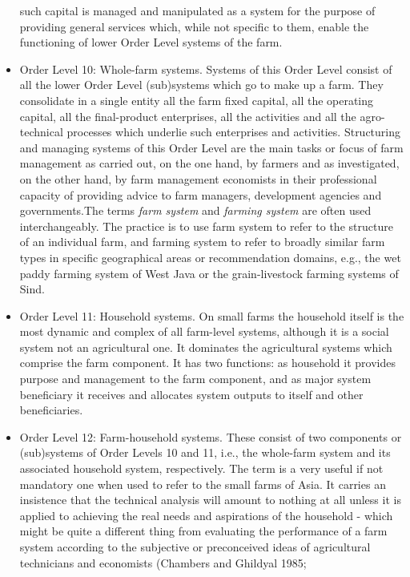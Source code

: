 \documentclass[11pt,]{book}
\theoremstyle{definition}
\theoremstyle{definition}
\theoremstyle{definition}
\theoremstyle{remark}
\begin{document}
\begin{itemize}
  such capital is managed and manipulated as a system for the purpose of
  providing general services which, while not specific to them, enable
  the functioning of lower Order Level systems of the farm.
\item
  Order Level 10: Whole-farm systems. Systems of this Order Level
  consist of all the lower Order Level (sub)systems which go to make up
  a farm. They consolidate in a single entity all the farm fixed
  capital, all the operating capital, all the final-product enterprises,
  all the activities and all the agro-technical processes which underlie
  such enterprises and activities. Structuring and managing systems of
  this Order Level are the main tasks or focus of farm management as
  carried out, on the one hand, by farmers and as investigated, on the
  other hand, by farm management economists in their professional
  capacity of providing advice to farm managers, development agencies
  and governments.\newline The terms \emph{farm system} and
  \emph{farming system} are often used interchangeably. The practice is
  to use farm system to refer to the structure of an individual farm,
  and farming system to refer to broadly similar farm types in specific
  geographical areas or recommendation domains, e.g., the wet paddy
  farming system of West Java or the grain-livestock farming systems of
  Sind.
\item
  Order Level 11: Household systems. On small farms the household itself
  is the most dynamic and complex of all farm-level systems, although it
  is a social system not an agricultural one. It dominates the
  agricultural systems which comprise the farm component. It has two
  functions: as household it provides purpose and management to the farm
  component, and as major system beneficiary it receives and allocates
  system outputs to itself and other beneficiaries.
\item
  Order Level 12: Farm-household systems. These consist of two
  components or (sub)systems of Order Levels 10 and 11, i.e., the
  whole-farm system and its associated household system, respectively.
  The term is a very useful if not mandatory one when used to refer to
  the small farms of Asia. It carries an insistence that the technical
  analysis will amount to nothing at all unless it is applied to
  achieving the real needs and aspirations of the household - which
  might be quite a different thing from evaluating the performance of a
  farm system according to the subjective or preconceived ideas of
  agricultural technicians and economists (Chambers and Ghildyal 1985;

\end{itemize}
\end{document}
